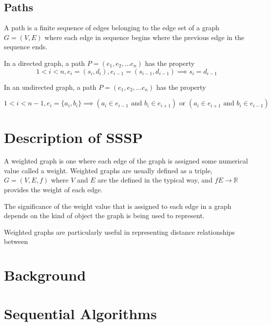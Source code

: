 \documentclass[12pt,twoside]{reedthesis}
\begin{document}
\subsection{Paths}

A path is a finite sequence of edges belonging to the edge set of a graph $G = (V,E)$ where each edge in sequence begins where the previous edge in the sequence ends.

In a directed graph, a path $P = (e_1, e_2, \ldots e_n)$ has the property
 $$1 < i < n, e_i = (s_i, d_i), e_{i-1} = (s_{i-1}, d_{i-1}) \implies s_i = d_{i-1}$$

In an undirected graph, a path $P = (e_1, e_2, \ldots e_n)$ has the property

$$
1 < i < n-1, e_i = \{a_i, b_i\} \implies (a_i \in e_{i-1} \mbox{ and } b_i \in e_{i+1} ) \mbox{ or } 
(a_i \in e_{i+1} \mbox{ and } b_i \in e_{i-1} )
$$


\section{Description of SSSP}

A weighted graph is one where each edge of the graph is assigned some numerical value called a weight. Weighted graphs are usually defined as a triple, $G = (V,E,f)$ where $V$ and $E$ are the defined in the typical way, and $f E \rightarrow \mathbb{R}$ provides the weight of each edge.

The significance of the weight value that is assigned to each edge in a graph depends on the kind of object the graph is being used to represent. 


Weighted graphs are particularly useful in representing distance relationships between 










\section{Background}
\section{Sequential Algorithms}
\end{document}
